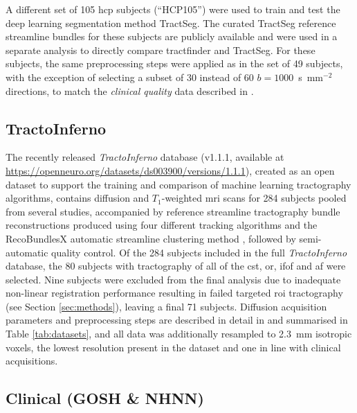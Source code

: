 A different set of 105 \gls{hcp} subjects (``HCP105'') were used to train and test the deep learning segmentation method TractSeg\autocite{Wasserthal2018}.
The curated TractSeg reference streamline bundles for these subjects are publicly available\autocite{Wasserthal2018b} and were used in a separate analysis to directly compare tractfinder and TractSeg.
For these subjects, the same preprocessing steps were applied as in the set of 49 subjects, with the exception of selecting a subset of 30 instead of 60 $b=1000$~s~mm$^{-2}$ directions, to match the \textit{clinical quality} data described in \textcite{Wasserthal2018}.

\subsection{TractoInferno}

The recently released \textit{TractoInferno} database (v1.1.1, available at \url{https://openneuro.org/datasets/ds003900/versions/1.1.1})\autocite{Poulin2022a,Poulin2022}, created as an open dataset to support the training and comparison of machine learning tractography algorithms, contains diffusion and $T_1$-weighted \gls{mri} scans for 284 subjects pooled from several studies, accompanied by reference streamline tractography bundle reconstructions produced using four different tracking algorithms and the RecoBundlesX automatic streamline clustering method \autocite{Garyfallidis2018,Rheault2020a}, followed by semi-automatic quality control.
Of the 284 subjects included in the full \textit{TractoInferno} database, the 80 subjects with tractography of all of the \gls{cst}, \gls{or}, \gls{ifof} and \gls{af} were selected.
Nine subjects were excluded from the final analysis due to inadequate non-linear registration performance resulting in failed targeted \gls{roi} tractography (see Section \ref{sec:methods}), leaving a final 71 subjects.
Diffusion acquisition parameters and preprocessing steps are described in detail in \textcite{Poulin2022} and summarised in Table \ref{tab:datasets}, and all data was additionally resampled to 2.3~mm isotropic voxels, the lowest resolution present in the dataset and one in line with clinical acquisitions.

\subsection{Clinical (GOSH \& NHNN)}

